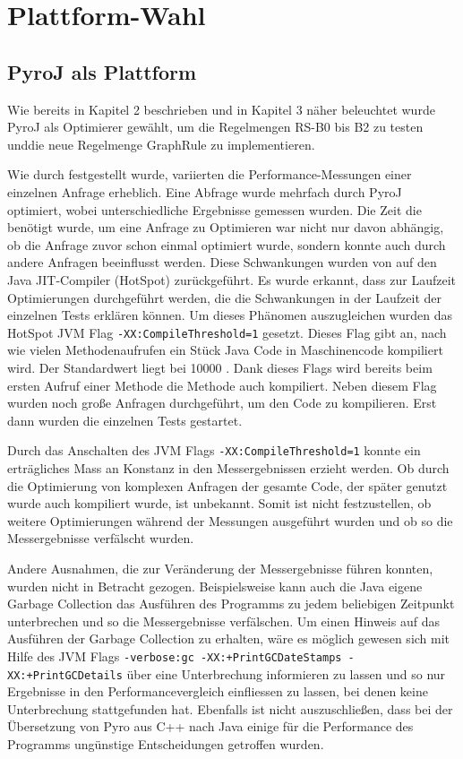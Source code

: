 \section{Plattform-Wahl}

\subsection{PyroJ als Plattform}

Wie bereits in Kapitel 2 beschrieben und in Kapitel 3 näher beleuchtet wurde PyroJ als Optimierer gewählt, um die Regelmengen RS-B0 bis B2 zu testen unddie neue Regelmenge GraphRule zu implementieren.

Wie durch \cite{shanbhag2014optimizing} festgestellt wurde, variierten die Performance-Messungen einer einzelnen Anfrage erheblich. Eine Abfrage wurde mehrfach durch PyroJ optimiert, wobei unterschiedliche Ergebnisse gemessen wurden. Die Zeit die benötigt wurde, um eine Anfrage zu Optimieren war nicht nur davon abhängig, ob die Anfrage zuvor schon einmal optimiert wurde, sondern konnte auch durch andere Anfragen beeinflusst werden. Diese Schwankungen wurden von \cite{shanbhag2014optimizing} auf den Java JIT-Compiler (HotSpot) zurückgeführt. Es wurde erkannt, dass zur Laufzeit Optimierungen durchgeführt werden, die die Schwankungen in der Laufzeit der einzelnen Tests erklären können. Um dieses Phänomen auszugleichen wurden das HotSpot JVM Flag \texttt{-XX:CompileThreshold=1} gesetzt. Dieses Flag gibt an, nach wie vielen Methodenaufrufen ein Stück Java Code in Maschinencode kompiliert wird. Der Standardwert liegt bei 10000 \cite{oracle2015VMOptions}. Dank dieses Flags wird bereits beim ersten Aufruf einer Methode die Methode auch kompiliert. Neben diesem Flag wurden noch große Anfragen durchgeführt, um den Code zu kompilieren. Erst dann wurden die einzelnen Tests gestartet.


Durch das Anschalten des JVM Flags \texttt{-XX:CompileThreshold=1} konnte ein erträgliches Mass an Konstanz in den Messergebnissen erzieht werden. Ob durch die Optimierung von komplexen Anfragen der gesamte Code, der später genutzt wurde auch kompiliert wurde, ist unbekannt. Somit ist nicht festzustellen, ob weitere Optimierungen während der Messungen ausgeführt wurden und ob so die Messergebnisse verfälscht wurden.

Andere Ausnahmen, die zur Veränderung der Messergebnisse führen konnten, wurden nicht in Betracht gezogen. Beispielsweise kann auch die Java eigene  Garbage Collection das Ausführen des Programms zu jedem beliebigen Zeitpunkt unterbrechen und so die Messergebnisse verfälschen. Um einen Hinweis auf das Ausführen der Garbage Collection zu erhalten, wäre es möglich gewesen sich mit Hilfe des  JVM Flags \texttt{-verbose:gc -XX:+PrintGCDateStamps -XX:+PrintGCDetails} über eine Unterbrechung informieren zu lassen  \cite{andreasson2015JVM}  und so nur Ergebnisse in den Performancevergleich einfliessen zu lassen, bei denen keine Unterbrechung stattgefunden hat. Ebenfalls ist nicht auszuschließen, dass bei der Übersetzung von Pyro aus C++ nach Java einige für die Performance des Programms ungünstige Entscheidungen getroffen wurden. 




